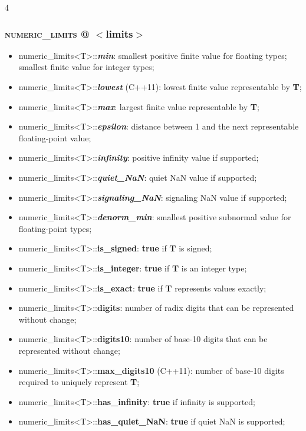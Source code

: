 \documentclass[10pt]{article}
\begin{document}
\begin{multicols*}{4}
{{\subsubsection*{\textsc{numeric\_limits} @ $<$limits$>$} 
\begin{itemize}[leftmargin=*,topsep=0.25pt]
  \setlength\itemsep{-1.8pt}
  \item numeric\_limits<T>::\emph{\textbf{min}}: smallest positive finite value for floating types; smallest finite value for integer types;
  \item numeric\_limits<T>::\emph{\textbf{lowest}} (C++11): lowest finite value representable by \textbf{T};
  \item numeric\_limits<T>::\emph{\textbf{max}}: largest finite value representable by \textbf{T};
  \item numeric\_limits<T>::\emph{\textbf{epsilon}}: distance between 1 and the next representable floating-point value;
  \item numeric\_limits<T>::\emph{\textbf{infinity}}: positive infinity value if supported;
  \item numeric\_limits<T>::\emph{\textbf{quiet\_NaN}}: quiet NaN value if supported;
  \item numeric\_limits<T>::\emph{\textbf{signaling\_NaN}}: signaling NaN value if supported;
  \item numeric\_limits<T>::\emph{\textbf{denorm\_min}}: smallest positive subnormal value for floating-point types;
  \item numeric\_limits<T>::\textbf{is\_signed}: \textbf{true} if \textbf{T} is signed;
  \item numeric\_limits<T>::\textbf{is\_integer}: \textbf{true} if \textbf{T} is an integer type;
  \item numeric\_limits<T>::\textbf{is\_exact}: \textbf{true} if \textbf{T} represents values exactly;
  \item numeric\_limits<T>::\textbf{digits}: number of radix digits that can be represented without change;
  \item numeric\_limits<T>::\textbf{digits10}: number of base-10 digits that can be represented without change;
  \item numeric\_limits<T>::\textbf{max\_digits10} (C++11): number of base-10 digits required to uniquely represent \textbf{T};
  \item numeric\_limits<T>::\textbf{has\_infinity}: \textbf{true} if infinity is supported;
  \item numeric\_limits<T>::\textbf{has\_quiet\_NaN}: \textbf{true} if quiet NaN is supported;
\end{itemize}

}}
\end{multicols*}
\end{document}
